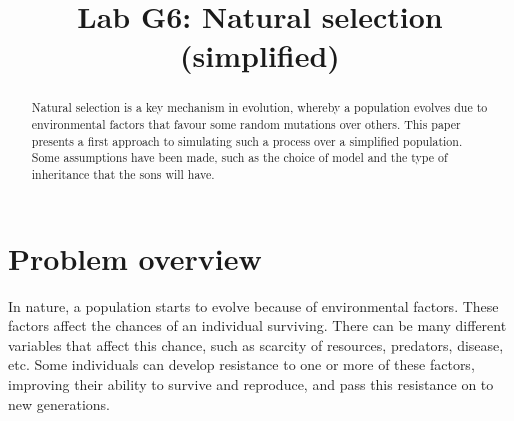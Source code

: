\documentclass[conference]{IEEEtran}
\begin{document}
\title{
Lab G6: Natural selection (simplified)
}

\author{
}

\maketitle
\begin{abstract}
    Natural selection is a key mechanism in evolution, whereby a population evolves due to environmental factors that favour some random mutations over others.
    This paper presents a first approach to simulating such a process over a simplified population. 
    Some assumptions have been made, such as the choice of model and the type of inheritance that the sons will have. 
\end{abstract}

\section{Problem overview}

    In nature, a population starts to evolve because of environmental factors. 
    These factors affect the chances of an individual surviving. 
    There can be many different variables that affect this chance, such as scarcity of resources, predators, disease, etc. 
    Some individuals can develop resistance to one or more of these factors, improving their ability to survive and reproduce, and pass this resistance on to new generations. 


\end{document}
